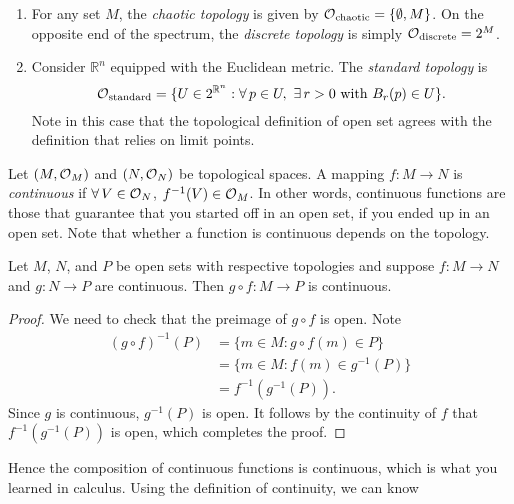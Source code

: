 \begin{example*}{}{}
  \leavevmode
  \begin{enumerate}
    \item For any set $M$, the {\it chaotic topology} 
          is given by $\operatorname{\mathcal{O}}_{\text{chaotic}}=\{\emptyset,M\}$. On the 
          opposite end of the spectrum, the {\it discrete topology}
           is simply $\operatorname{\mathcal{O}}_{\text{discrete}}=2^M$.
    \item Consider $\mathbb{R}^n$ equipped with the Euclidean metric. The
          {\it standard topology}  is 
          $$\topol{\text{standard}}=
          \{U\in2^{\mathbb{R}^n}:\Forall p\in U,\ \Exists r>0\ 
          \text{with}\ B_r(p)\in U\}.$$ Note in this case that the topological
          definition of open set agrees with the definition that relies
          on limit points.
  \end{enumerate}
\end{example*}
Let $(M,\operatorname{\mathcal{O}}_{M})$ and $(N,\operatorname{\mathcal{O}}_{N})$ be topological spaces. A mapping
$f:M\to N$ is {\it continuous}\index{map!continuous} if 
$\operatorname{\forall} V\in \operatorname{\mathcal{O}}_{N}$, $f^{-1}(V)\in\operatorname{\mathcal{O}}_{M}$.
In other words, continuous functions are those that guarantee that you started
off in an open set, if you ended up in an open set. Note that whether a
function is continuous depends on the topology.
\begin{theorem}{}{}
  Let $M$, $N$, and $P$ be open sets with respective topologies and suppose
  $f:M\to N$ and $g:N\to P$ are continuous. Then $g\circ f:M\to P$ is
  continuous.
  \begin{proof}
    We need to check that the preimage of $g\circ f$ is open. Note
    \begin{equation*}
    \begin{aligned}
      (g\circ f)^{-1}(P)&=\{m\in M:g\circ f(m)\in P\}\\
        &=\{m\in M:f(m)\in g^{-1}(P)\}\\
        &=f^{-1}(g^{-1}(P)).
    \end{aligned}
    \end{equation*}
    Since $g$ is continuous, $g^{-1}(P)$ is open. It follows by
    the continuity of $f$ that $f^{-1}(g^{-1}(P))$ is open,
    which completes the proof.
  \end{proof}
\end{theorem}
Hence the composition of continuous functions is continuous, which is what
you learned in calculus. Using the definition of continuity, we can know
